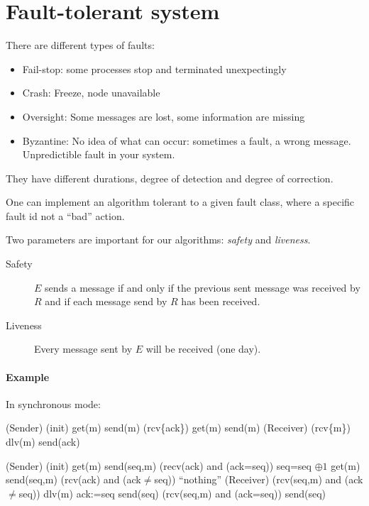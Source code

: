 \documentclass{article}
\begin{document}
\section{Fault-tolerant system}
There are different types of faults:
\begin{itemize}[noitemsep]
\item Fail-stop: some processes stop and terminated unexpectingly
\item Crash: Freeze, node unavailable
\item Oversight: Some messages are lost, some information are missing
\item Byzantine: No idea of what can occur: sometimes a fault, a wrong message. Unpredictible fault in your system. 
\end{itemize}

They have different durations, degree of detection and degree of correction.
\medskip

One can implement an algorithm tolerant to a given fault class, where a specific fault id not a ``bad'' action.
\bigskip

Two parameters are important for our algorithms: \emph{safety} and \emph{liveness}.


\begin{description}
\item[Safety] $E$ sends a message if and only if the previous sent message was received by $R$ and if each message send by $R$ has been received.
\item[Liveness] Every message sent by $E$ will be received (one day).
\end{description}
\paragraph{Example}
In synchronous mode:


\begin{algorithm}
\Label(Sender){
	\Label(init){
		get(m)\;
		send(m)\;
	}
	\Label(rcv\{ack\}){
		get(m)\;
		send(m)\;
	}
}
\Label(Receiver){
	\Label(rcv\{m\}){		
		dlv(m)\;
		send(ack)\;
	}
}
\end{algorithm}


\begin{algorithm}
\Label(Sender){
	\Label(init){
		get(m)\;
		send(seq,m)\;
	}
	\Label({recv(ack) and (ack=seq)}){
		seq=seq $\oplus 1$\;		
		get(m)\;
		send(seq,m)\;
	}
	\Label({rcv(ack) and (ack$\neq$seq)}){
		``nothing''\;
	}
}
\Label(Receiver){
	\Label({rcv(seq,m) and (ack$\neq$seq)}){		
		dlv(m)\;
		ack:=seq\;
		send(seq)\;
	}
	\Label({rcv(seq,m) and (ack=seq)}){
		send(seq)\;
	}
}
\end{algorithm}
\clearpage
\end{document}
